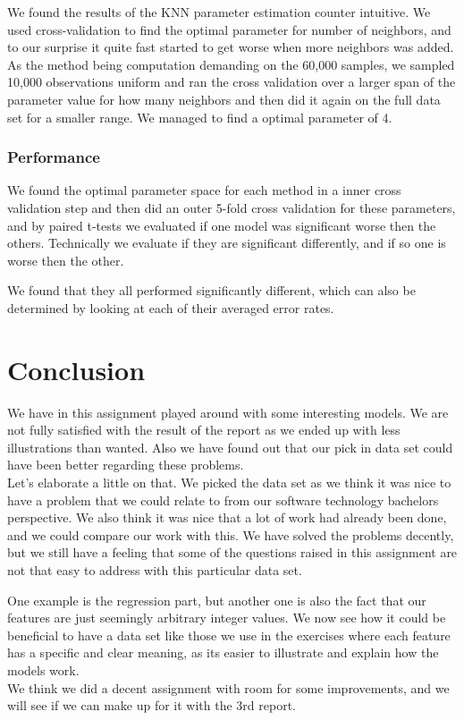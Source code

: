 We found the results of the KNN parameter estimation counter intuitive. We used cross-validation to find the optimal parameter for number of neighbors, and to our surprise it quite fast started to get worse when more neighbors was added. As the method being computation demanding on the 60,000 samples, we sampled 10,000 observations uniform and ran the cross validation over a larger span of the parameter value for how many neighbors and then did it again on the full data set for a smaller range. We managed to find a optimal parameter of 4.

\subsection{Performance} 
We found the optimal parameter space for each method in a inner cross validation step and then did an outer 5-fold cross validation for these parameters, and by paired t-tests we evaluated if one model was significant worse then the others. Technically we evaluate if they are significant differently, and if so one is worse then the other.

We found that they all performed significantly different, which can also be determined by looking at each of their averaged error rates.


\chapter{Conclusion}

We have in this assignment played around with some interesting models. We are not fully satisfied with the result of the report as we ended up with less illustrations than wanted. Also we have found out that our pick in data set could have been better regarding these problems. \\

Let's elaborate a little on that. We picked the data set as we think it was nice to have a problem that we could relate to from our software technology bachelors perspective. We also think it was nice that a lot of work had already been done, and we could compare our work with this. We have solved the problems decently, but we still have a feeling that some of the questions raised in this assignment are not that easy to address with this particular data set. 

One example is the regression part, but another one is also the fact that our features are just seemingly arbitrary integer values. We now see how it could be beneficial to have a data set like those we use in the exercises where each feature has a specific and clear meaning, as its easier to illustrate and explain how the models work. \\

We think we did a decent assignment with room for some improvements, and we will see if we can make up for it with the 3rd report. 

